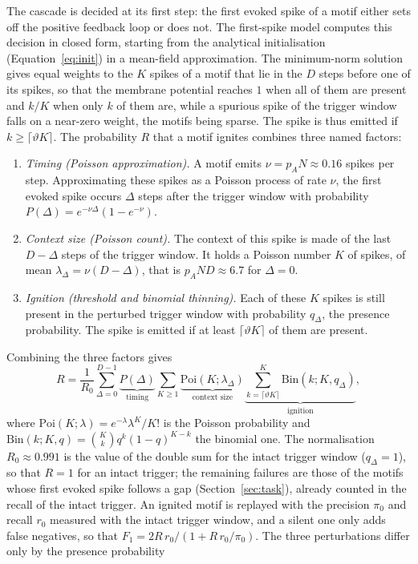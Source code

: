 \documentclass{scrartcl}
\begin{document}
The cascade is decided at its first step: the first evoked spike of a motif either sets off the positive feedback loop or does not. The first-spike model computes this decision in closed form, starting from the analytical initialisation (Equation~\ref{eq:init}) in a mean-field approximation. The minimum-norm solution gives equal weights to the $K$ spikes of a motif that lie in the $D$ steps before one of its spikes, so that the membrane potential reaches $1$ when all of them are present and $k/K$ when only $k$ of them are, while a spurious spike of the trigger window falls on a near-zero weight, the motifs being sparse. The spike is thus emitted if $k \geq \lceil \vartheta K \rceil$. The probability $R$ that a motif ignites combines three named factors:
\begin{enumerate}
  \item \emph{Timing (Poisson approximation).} A motif emits $\nu = p_A N \approx 0.16$ spikes per step. Approximating these spikes as a Poisson process of rate $\nu$, the first evoked spike occurs $\Delta$ steps after the trigger window with probability $P(\Delta) = e^{-\nu \Delta}(1 - e^{-\nu})$.
  \item \emph{Context size (Poisson count).} The context of this spike is made of the last $D - \Delta$ steps of the trigger window. It holds a Poisson number $K$ of spikes, of mean $\lambda_\Delta = \nu (D - \Delta)$, that is $p_A N D \approx 6.7$ for $\Delta = 0$.
  \item \emph{Ignition (threshold and binomial thinning).} Each of these $K$ spikes is still present in the perturbed trigger window with probability $q_\Delta$, the presence probability. The spike is emitted if at least $\lceil \vartheta K \rceil$ of them are present.
\end{enumerate}
Combining the three factors gives
\begin{equation}
  R = \frac{1}{R_0} \sum_{\Delta=0}^{D-1} \underbrace{P(\Delta)}_{\text{timing}} \sum_{K \geq 1} \underbrace{\mathrm{Poi}(K;\lambda_\Delta)}_{\text{context size}} \underbrace{\sum_{k = \lceil \vartheta K \rceil}^{K} \mathrm{Bin}(k;K,q_\Delta)}_{\text{ignition}},
  \label{eq:ignition}
\end{equation}
where $\mathrm{Poi}(K;\lambda) = e^{-\lambda}\lambda^K/K!$ is the Poisson probability and $\mathrm{Bin}(k;K,q) = \binom{K}{k} q^k (1 - q)^{K-k}$ the binomial one. The normalisation $R_0 \approx 0.991$ is the value of the double sum for the intact trigger window ($q_\Delta = 1$), so that $R = 1$ for an intact trigger; the remaining failures are those of the motifs whose first evoked spike follows a gap (Section~\ref{sec:task}), already counted in the recall of the intact trigger. An ignited motif is replayed with the precision $\pi_0$ and recall $r_0$ measured with the intact trigger window, and a silent one only adds false negatives, so that $F_1 = 2 R\, r_0 / (1 + R\, r_0 / \pi_0)$. The three perturbations differ only by the presence probability
\end{document}
